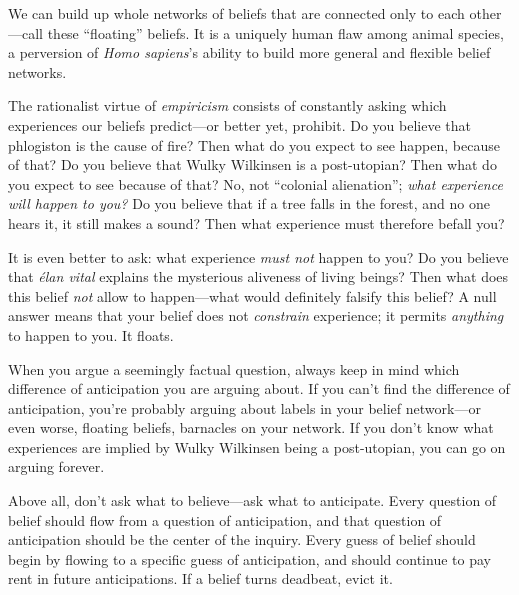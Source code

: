 {
 We can build up whole networks of beliefs that are connected only
to each other---call these
``floating'' beliefs. It is a
uniquely human flaw among animal species, a perversion of \textit{Homo
sapiens}'s ability to build more general and flexible
belief networks.}

{
 The rationalist virtue of \textit{empiricism} consists of
constantly asking which experiences our beliefs predict---or better
yet, prohibit. Do you believe that phlogiston is the cause of fire?
Then what do you expect to see happen, because of that? Do you believe
that Wulky Wilkinsen is a post-utopian? Then what do you expect to see
because of that? No, not ``colonial
alienation''; \textit{what experience will happen to
you?} Do you believe that if a tree falls in the forest, and no one
hears it, it still makes a sound? Then what experience must therefore
befall you?}

{
 It is even better to ask: what experience \textit{must not} happen
to you? Do you believe that \textit{élan vital} explains the mysterious
aliveness of living beings? Then what does this belief \textit{not}
allow to happen---what would definitely falsify this belief? A null
answer means that your belief does not \textit{constrain} experience;
it permits \textit{anything} to happen to you. It floats.}

{
 When you argue a seemingly factual question, always keep in mind
which difference of anticipation you are arguing about. If you
can't find the difference of anticipation,
you're probably arguing about labels in your belief
network---or even worse, floating beliefs, barnacles on your network.
If you don't know what experiences are implied by Wulky
Wilkinsen being a post-utopian, you can go on arguing forever.}

{
 Above all, don't ask what to believe---ask what to
anticipate. Every question of belief should flow from a question of
anticipation, and that question of anticipation should be the center of
the inquiry. Every guess of belief should begin by flowing to a
specific guess of anticipation, and should continue to pay rent in
future anticipations. If a belief turns deadbeat, evict it.}

\myendsectiontext


